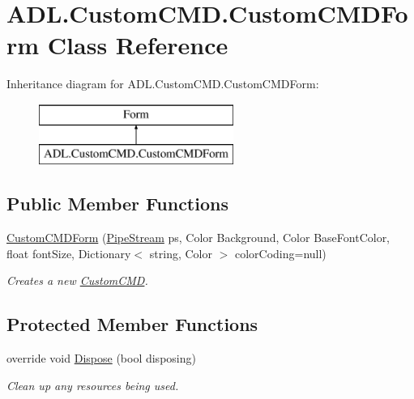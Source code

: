 \hypertarget{class_a_d_l_1_1_custom_c_m_d_1_1_custom_c_m_d_form}{}\section{A\+D\+L.\+Custom\+C\+M\+D.\+Custom\+C\+M\+D\+Form Class Reference}
\label{class_a_d_l_1_1_custom_c_m_d_1_1_custom_c_m_d_form}
Inheritance diagram for A\+D\+L.\+Custom\+C\+M\+D.\+Custom\+C\+M\+D\+Form\+:\begin{figure}[H]
\begin{center}
\leavevmode
\includegraphics[height=2.000000cm]{class_a_d_l_1_1_custom_c_m_d_1_1_custom_c_m_d_form}
\end{center}
\end{figure}
\subsection*{Public Member Functions}
\begin{DoxyCompactItemize}
\item 
\mbox{\hyperlink{class_a_d_l_1_1_custom_c_m_d_1_1_custom_c_m_d_form_a949c39b280cf0d3fe4490c8731078bad}{Custom\+C\+M\+D\+Form}} (\mbox{\hyperlink{class_a_d_l_1_1_pipe_stream}{Pipe\+Stream}} ps, Color Background, Color Base\+Font\+Color, float font\+Size, Dictionary$<$ string, Color $>$ color\+Coding=null)
\begin{DoxyCompactList}\small\item\em Creates a new \mbox{\hyperlink{namespace_a_d_l_1_1_custom_c_m_d}{Custom\+C\+MD}}. \end{DoxyCompactList}\end{DoxyCompactItemize}
\subsection*{Protected Member Functions}
\begin{DoxyCompactItemize}
\item 
override void \mbox{\hyperlink{class_a_d_l_1_1_custom_c_m_d_1_1_custom_c_m_d_form_a17d8b37ecf0237238b3f2f988a4ec700}{Dispose}} (bool disposing)
\begin{DoxyCompactList}\small\item\em Clean up any resources being used. \end{DoxyCompactList}\end{DoxyCompactItemize}


